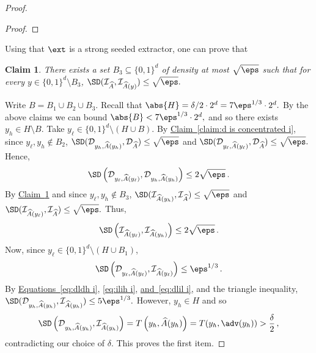 \documentclass[11pt]{article}
\numberwithin{equation}{section}
\newtheorem{claim}[theorem]{Claim}
\theoremstyle{definition}
\theoremstyle{plain}
\newcommand{\expref}[2]{\hyperref[#2]{#1~\ref{#2}}}
\newcommand{\expeqref}[2]{\hyperref[#2]{#1~\eqref{#2}}}
\begin{document}
\begin{proof}
\begin{proof}
	\end{proof}
	Using that $\ext$ is a strong seeded extractor, one can prove that
	\begin{claim}\label{claim:i is concentrated i}
		There exists a set
		$B_3 \subseteq \{0,1\}^d$ of density at most $\sqrt{\eps}$ such that for every $y \in \{0,1\}^d \setminus B_3$,
		$
		\SD(\mathcal{I}_{\widehat{A}}, \mathcal{I}_{\widehat{A}(y)}) \le \sqrt{\eps}.
		$
	\end{claim}
	
	Write $B = B_1 \cup B_2 \cup B_3$. Recall that 
	$\abs{H} = \delta/2\cdot 2^d = 7\eps^{1/3} \cdot 2^d.$ 
	By the above claims we can bound
	$
	\abs{B} < 7\eps^{1/3} \cdot 2^d,
	$
	and so there exists $y_h \in H \setminus B$.  Take $y_\ell \in \{0,1\}^d \setminus (H \cup B)$. 	
	By \expref{Claim}{claim:d is concentrated i}, since $y_\ell,y_h \notin B_2$,
	$\SD(\mathcal{D}_{y_h,\widehat{A}(y_h)}, \mathcal{D}_{\widehat{A}} ) \le \sqrt{\eps}$ and
	$\SD(\mathcal{D}_{y_\ell,\widehat{A}(y_\ell)}, \mathcal{D}_{\widehat{A}} ) \le \sqrt{\eps}.
	$
	Hence,
	\begin{equation}\label{eq:dldh i}
	\SD\left(\mathcal{D}_{y_\ell,\widehat{A}(y_\ell)}, \mathcal{D}_{y_h,\widehat{A}(y_h)}\right) \le 2\sqrt{\eps}\,.
	\end{equation}
	By \expref{Claim}{claim:i is concentrated i} and since $y_\ell,y_h \notin B_3$,
 	$
	\SD(\mathcal{I}_{\widehat{A}(y_h)}, \mathcal{I}_{\widehat{A}} ) \le \sqrt{\eps}$ and
	$\SD(\mathcal{I}_{\widehat{A}(y_\ell)}, \mathcal{I}_{\widehat{A}} ) \le \sqrt{\eps}.
$
	Thus,
	\begin{equation}\label{eq:ilih i}
	\SD\left(\mathcal{I}_{\widehat{A}(y_\ell)}, \mathcal{I}_{\widehat{A}(y_h)} \right) \le 2\sqrt{\eps}\,.
	\end{equation}
	Now, since $y_\ell \in \{0,1\}^d \setminus (H \cup B_1)$,
	\begin{equation}\label{eq:dlil i}
	\SD\left(\mathcal{D}_{y_\ell,\widehat{A}(y_\ell)}, \mathcal{I}_{\widehat{A}(y_\ell)}\right) \le \eps^{1/3}\,.
	\end{equation}
%
 By \expeqref{Equations}{eq:dldh i}, \eqref{eq:ilih i}, \expeqref{and}{eq:dlil i}, %
and the triangle inequality,
	$
	\SD(\mathcal{D}_{y_h,\widehat{A}(y_h)}, \mathcal{I}_{\widehat{A}(y_h)}) \le 5 \eps^{1/3}.
	$
	However, $y_h \in H$ and so
	\begin{align*}
	\SD\left( \mathcal{D}_{y_h,\widehat{A}(y_h)}, \mathcal{I}_{\widehat{A}(y_h)} \right) = T\left(y_h,\widehat{A}(y_h)\right) 
	= T(y_h, \adv(y_h)) > \frac{\delta}{2}\,,
	\end{align*}
	contradicting our choice of $\delta$. This proves the first item.
	

\end{proof}
\end{document}
